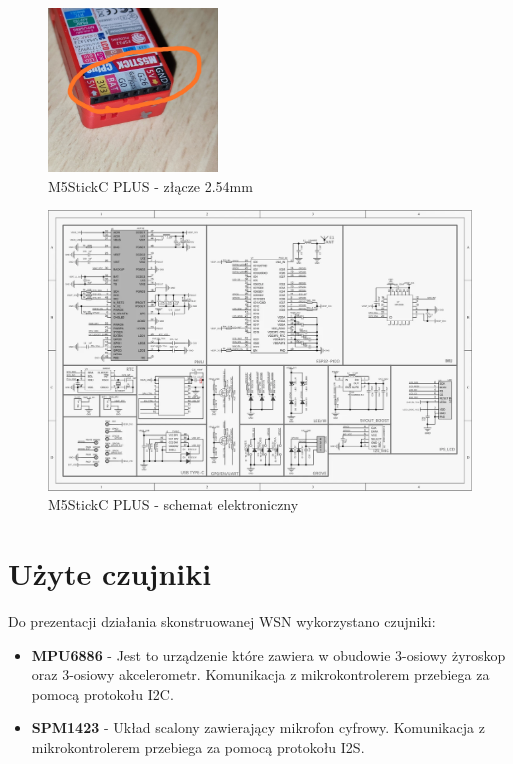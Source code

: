 \documentclass[12pt,oneside,a4paper]{book}
\theoremstyle{break}
\begin{document}
\begin{figure}[H]
    \begin{center}
        \includegraphics[width=0.4\textwidth]{header254}    
        \caption{M5StickC PLUS - złącze 2.54mm}
        \label{rys:header254}
    \end{center}
\end{figure}

\begin{figure}[H]
    \begin{center}
        \includegraphics[width=1\textwidth]{schematic.png}    
        \caption{M5StickC PLUS - schemat elektroniczny}
    \end{center}
\end{figure}

\section{Użyte czujniki}
Do prezentacji działania skonstruowanej WSN wykorzystano czujniki:
    \begin{itemize}
        \item \textbf{MPU6886} - Jest to urządzenie które zawiera w obudowie 3-osiowy żyroskop
        oraz 3-osiowy akcelerometr. Komunikacja z mikrokontrolerem przebiega za pomocą
        protokołu I2C. \cite{MPU6886}
        \item \textbf{SPM1423} - Układ scalony zawierający mikrofon cyfrowy. Komunikacja z mikrokontrolerem
        przebiega za pomocą protokołu I2S. \cite{SPM1423}
    \end{itemize}
\end{document}
